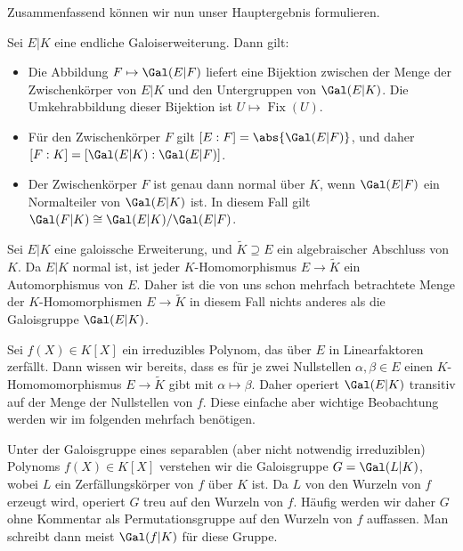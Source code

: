 \documentclass[12pt,a4paper,twoside]{article}
\DeclareMathOperator{\Fix}{Fix}
\begin{document}
Zusammenfassend k\"onnen wir nun unser Hauptergebnis formulieren.
\begin{Satz}
  Sei $E|K$ eine endliche Galoiserweiterung. Dann gilt:
  \begin{itemize}
  \item[(a)] Die Abbildung $F\mapsto\Gal(E|F)$ liefert eine Bijektion zwischen
    der Menge der Zwischenk\"orper von $E|K$ und den Untergruppen von
    $\Gal(E|K)$. Die Umkehrabbildung dieser Bijektion ist $U\mapsto \Fix(U)$.
\item[(b)] F\"ur den Zwischenk\"orper $F$ gilt $[E:F]=\abs{\Gal(E|F)}$, und
  daher $[F:K]=[\Gal(E|K):\Gal(E|F)]$.
\item[(c)] Der Zwischenk\"orper $F$ ist genau dann normal \"uber $K$, wenn
  $\Gal(E|F)$ ein Normalteiler von $\Gal(E|K)$ ist. In diesem Fall gilt
  $\Gal(F|K)\cong\Gal(E|K)/\Gal(E|F)$.
  \end{itemize}
\end{Satz}
\begin{Bemerkung*}
  Sei $E|K$ eine galoissche Erweiterung, und $\tilde K\supseteq E$ ein
  algebraischer Abschluss von $K$. Da $E|K$ normal ist, ist jeder
  $K$-Homomorphismus $E\to\tilde K$ ein Automorphismus von $E$. Daher ist die
  von uns schon mehrfach betrachtete Menge der $K$-Homomorphismen $E\to \tilde
  K$ in diesem Fall nichts anderes als die Galoisgruppe $\Gal(E|K)$.
  
  Sei $f(X)\in K[X]$ ein irreduzibles Polynom, das \"uber $E$ in
  Linearfaktoren zerf\"allt. Dann wissen wir bereits, dass es f\"ur je zwei
  Nullstellen $\alpha,\beta\in E$ einen $K$-Homomomorphismus $E\to\tilde K$
  gibt mit $\alpha\mapsto\beta$. Daher operiert $\Gal(E|K)$ transitiv auf der
  Menge der Nullstellen von $f$. Diese einfache aber wichtige Beobachtung
  werden wir im folgenden mehrfach ben\"otigen.
  
  Unter der Galoisgruppe eines separablen (aber nicht notwendig irreduziblen)
  Polynoms $f(X)\in K[X]$ verstehen wir die Galoisgruppe $G=\Gal(L|K)$, wobei
  $L$ ein Zerf\"allungsk\"orper von $f$ \"uber $K$ ist. Da $L$ von den Wurzeln
  von $f$ erzeugt wird, operiert $G$ treu auf den Wurzeln von $f$. H\"aufig
  werden wir daher $G$ ohne Kommentar als Permutationsgruppe auf den Wurzeln
  von $f$ auffassen. Man schreibt dann meist $\Gal(f|K)$ f\"ur diese Gruppe.
\end{Bemerkung*}
\end{document}
